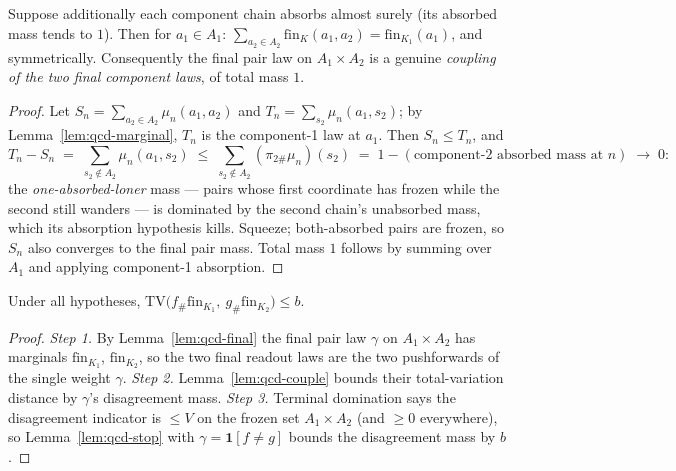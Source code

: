 \begin{blemma}\label{lem:qcd-final}
Suppose additionally each component chain absorbs almost surely
(its absorbed mass tends to $1$). Then for $a_1 \in A_1$:
$\sum_{a_2 \in A_2} \mathrm{fin}_K(a_1, a_2) =
\mathrm{fin}_{K_1}(a_1)$, and symmetrically. Consequently the final
pair law on $A_1 \times A_2$ is a genuine \emph{coupling of the two
final component laws}, of total mass $1$.
\end{blemma}
\begin{proof}
Let $S_n = \sum_{a_2 \in A_2} \mu_n(a_1, a_2)$ and
$T_n = \sum_{s_2} \mu_n(a_1, s_2)$; by Lemma~\ref{lem:qcd-marginal},
$T_n$ is the component-1 law at $a_1$. Then $S_n \leq T_n$, and
\[
T_n - S_n \;=\; \textstyle\sum_{s_2 \notin A_2} \mu_n(a_1, s_2)
\;\leq\; \textstyle\sum_{s_2 \notin A_2} (\pi_{2\#}\mu_n)(s_2)
\;=\; 1 - (\text{component-2 absorbed mass at } n) \;\longrightarrow\; 0 :
\]
the \emph{one-absorbed-loner} mass --- pairs whose first coordinate has
frozen while the second still wanders --- is dominated by the second
chain's unabsorbed mass, which its absorption hypothesis kills.
Squeeze; both-absorbed pairs are frozen, so $S_n$ also converges to the
final pair mass. Total mass $1$ follows by summing over $A_1$ and
applying component-1 absorption.
\end{proof}

\begin{bthm}\label{thm:qcd-tv}
Under all hypotheses,
$\mathrm{TV}\bigl(f_{\#}\mathrm{fin}_{K_1},\ g_{\#}\mathrm{fin}_{K_2}\bigr)
\leq b$.
\end{bthm}
\begin{proof}
\emph{Step 1.} By Lemma~\ref{lem:qcd-final} the final pair law $\gamma$
on $A_1 \times A_2$ has marginals $\mathrm{fin}_{K_1}$,
$\mathrm{fin}_{K_2}$, so the two final readout laws are the two
pushforwards of the single weight $\gamma$.
\emph{Step 2.} Lemma~\ref{lem:qcd-couple} bounds their total-variation
distance by $\gamma$'s disagreement mass.
\emph{Step 3.} Terminal domination says the disagreement indicator is
$\leq V$ on the frozen set $A_1 \times A_2$ (and $\geq 0$ everywhere),
so Lemma~\ref{lem:qcd-stop} with $\gamma = \mathbf{1}[f \neq g]$ bounds
the disagreement mass by $b$.
\end{proof}

